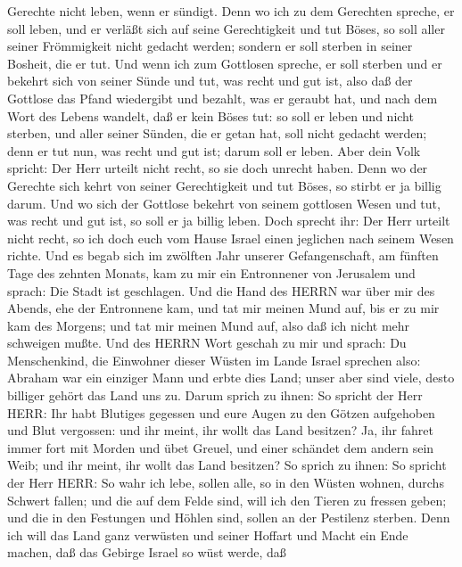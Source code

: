 Gerechte nicht leben, wenn er sündigt.  Denn wo ich zu dem
Gerechten spreche, er soll leben, und er verläßt sich auf seine
Gerechtigkeit und tut Böses, so soll aller seiner Frömmigkeit nicht
gedacht werden; sondern er soll sterben in seiner Bosheit, die er tut.
 Und wenn ich zum Gottlosen spreche, er soll sterben und er
bekehrt sich von seiner Sünde und tut, was recht und gut ist,
 also daß der Gottlose das Pfand wiedergibt und bezahlt,
was er geraubt hat, und nach dem Wort des Lebens wandelt, daß er kein
Böses tut: so soll er leben und nicht sterben,  und aller
seiner Sünden, die er getan hat, soll nicht gedacht werden; denn er tut
nun, was recht und gut ist; darum soll er leben.  Aber dein
Volk spricht: Der Herr urteilt nicht recht, so sie doch unrecht haben.
 Denn wo der Gerechte sich kehrt von seiner Gerechtigkeit
und tut Böses, so stirbt er ja billig darum.  Und wo sich
der Gottlose bekehrt von seinem gottlosen Wesen und tut, was recht und
gut ist, so soll er ja billig leben.  Doch sprecht ihr: Der
Herr urteilt nicht recht, so ich doch euch vom Hause Israel einen
jeglichen nach seinem Wesen richte.  Und es begab sich im
zwölften Jahr unserer Gefangenschaft, am fünften Tage des zehnten
Monats, kam zu mir ein Entronnener von Jerusalem und sprach: Die Stadt
ist geschlagen.  Und die Hand des HERRN war über mir des
Abends, ehe der Entronnene kam, und tat mir meinen Mund auf, bis er zu
mir kam des Morgens; und tat mir meinen Mund auf, also daß ich nicht
mehr schweigen mußte.  Und des HERRN Wort geschah zu mir
und sprach:  Du Menschenkind, die Einwohner dieser Wüsten
im Lande Israel sprechen also: Abraham war ein einziger Mann und erbte
dies Land; unser aber sind viele, desto billiger gehört das Land uns zu.
 Darum sprich zu ihnen: So spricht der Herr HERR: Ihr habt
Blutiges gegessen und eure Augen zu den Götzen aufgehoben und Blut
vergossen: und ihr meint, ihr wollt das Land besitzen?  Ja,
ihr fahret immer fort mit Morden und übet Greuel, und einer schändet dem
andern sein Weib; und ihr meint, ihr wollt das Land besitzen?
 So sprich zu ihnen: So spricht der Herr HERR: So wahr ich
lebe, sollen alle, so in den Wüsten wohnen, durchs Schwert fallen; und
die auf dem Felde sind, will ich den Tieren zu fressen geben; und die in
den Festungen und Höhlen sind, sollen an der Pestilenz sterben.
 Denn ich will das Land ganz verwüsten und seiner Hoffart
und Macht ein Ende machen, daß das Gebirge Israel so wüst werde, daß
